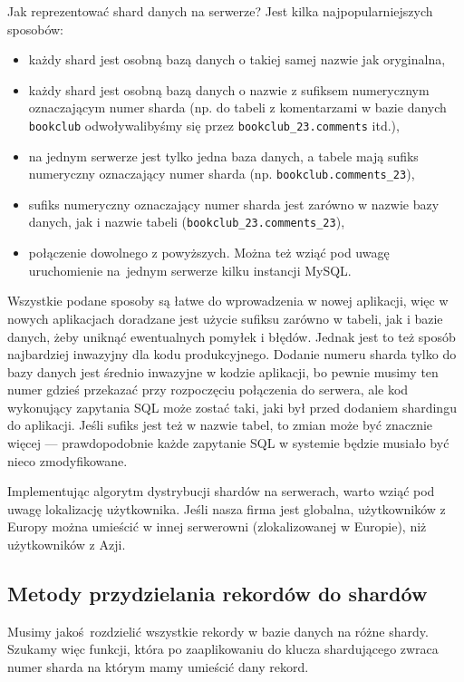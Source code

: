 \documentclass[a4paper,12pt]{article}
\begin{document}
Jak reprezentować shard danych na serwerze? Jest kilka najpopularniejszych sposobów:

\begin{itemize}
 \setlength{\itemsep}{0.06cm}
 \setlength{\parskip}{0.06cm}
 \item każdy shard jest osobną bazą danych o takiej samej nazwie jak oryginalna,
 \item każdy shard jest osobną bazą danych o nazwie z sufiksem numerycznym oznaczającym numer sharda (np. do tabeli z komentarzami w bazie danych \texttt{bookclub} odwoływalibyśmy się przez \texttt{bookclub\_23.comments} itd.),
 \item na jednym serwerze jest tylko jedna baza danych, a tabele mają sufiks numeryczny oznaczający numer sharda (np. \texttt{bookclub.comments\_23}),
 \item sufiks numeryczny oznaczający numer sharda jest zarówno w nazwie bazy danych, jak i nazwie tabeli (\texttt{bookclub\_23.comments\_23}),
 \item połączenie dowolnego z powyższych. Można też wziąć pod uwagę uruchomienie na~jednym serwerze kilku instancji MySQL.
\end{itemize}

Wszystkie podane sposoby są łatwe do wprowadzenia w nowej aplikacji, więc w nowych aplikacjach doradzane jest użycie sufiksu zarówno w tabeli, jak i bazie danych, żeby uniknąć ewentualnych pomyłek i błędów. Jednak jest to też sposób najbardziej inwazyjny dla kodu produkcyjnego. Dodanie numeru sharda tylko do bazy danych jest średnio inwazyjne w kodzie aplikacji, bo pewnie musimy ten numer gdzieś przekazać przy rozpoczęciu połączenia do serwera, ale kod wykonujący zapytania SQL może zostać taki, jaki był przed dodaniem shardingu do aplikacji. Jeśli sufiks jest też w nazwie tabel, to zmian może być znacznie więcej --- prawdopodobnie każde zapytanie SQL w systemie będzie musiało być nieco zmodyfikowane.

Implementując algorytm dystrybucji shardów na serwerach, warto wziąć pod uwagę lokalizację użytkownika. Jeśli nasza firma jest globalna, użytkowników z Europy można umieścić w innej serwerowni (zlokalizowanej w Europie), niż użytkowników z Azji.

\subsection{Metody przydzielania rekordów do shardów}

Musimy jakoś rozdzielić wszystkie rekordy w bazie danych na różne shardy. Szukamy więc funkcji, która po zaaplikowaniu do klucza shardującego zwraca numer sharda na którym mamy umieścić dany rekord.
\end{document}
